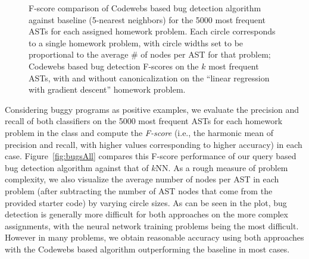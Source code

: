 \begin{figure}[t!]
\center
\qquad\qquad
{}

\caption{
  F-score comparison of Codewebs based bug detection algorithm against baseline (5-nearest neighbors) 
for the 5000 most frequent ASTs for each assigned homework problem.  Each circle corresponds to a single homework problem, 
with circle widths  set to be proportional to the average \# of nodes per AST for that problem; 
 Codewebs based bug detection F-scores on the $k$ most frequent ASTs, with and without canonicalization
on the ``linear regression with gradient descent'' homework problem.
}
\label{fig:exp2}
\end{figure}


Considering buggy programs as positive examples, we evaluate the precision and recall
of both classifiers on the 5000 most frequent ASTs for each homework problem in the class
and compute the \emph{F-score} (i.e., the harmonic mean of precision and recall, with higher values
corresponding to higher accuracy) in each case.
Figure~\ref{fig:bugsAll} compares this F-score performance of our query based bug detection
algorithm against that of $k$NN.   As a rough measure of problem complexity, we also visualize
 the average number of nodes per AST in each problem (after subtracting
the number of AST nodes that come from the provided starter code) by varying circle sizes.
As can be seen in the plot, bug detection is generally more difficult for both approaches on the more
complex assignments, with the neural network training problems being the most difficult.
However in many problems, we obtain reasonable accuracy using both approaches with
the Codewebs based algorithm outperforming the baseline in most cases.


